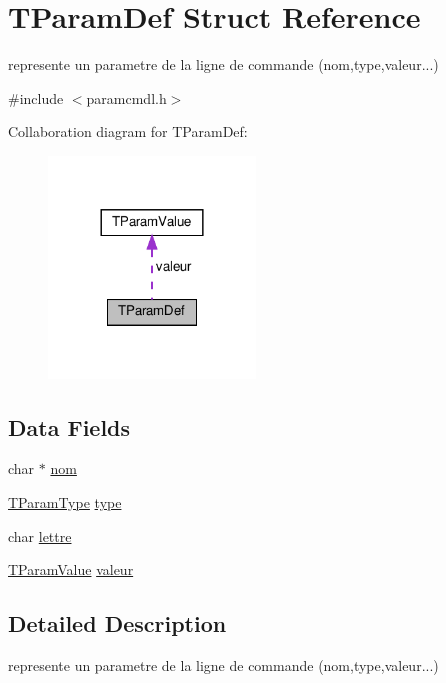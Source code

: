\hypertarget{structTParamDef}{}\section{T\+Param\+Def Struct Reference}
\label{structTParamDef}


represente un parametre de la ligne de commande (nom,type,valeur...)  




{\ttfamily \#include $<$paramcmdl.\+h$>$}



Collaboration diagram for T\+Param\+Def\+:
\nopagebreak
\begin{figure}[H]
\begin{center}
\leavevmode
\includegraphics[width=156pt]{structTParamDef__coll__graph}
\end{center}
\end{figure}
\subsection*{Data Fields}
\begin{DoxyCompactItemize}
\item 
char $\ast$ \hyperlink{structTParamDef_afa78db012abc7fecd18c60d6154e04f8}{nom}
\item 
\hyperlink{paramcmdl_8h_a07d4e5a29d675892ddc5f377533c06a5}{T\+Param\+Type} \hyperlink{structTParamDef_aaa8c69f39c6dd02a968dc15044810327}{type}
\item 
char \hyperlink{structTParamDef_a66254f6368c5542d3f14afdd1ea1e621}{lettre}
\item 
\hyperlink{unionTParamValue}{T\+Param\+Value} \hyperlink{structTParamDef_a3f5cbf75e393d35bb230dfe293f7c7ba}{valeur}
\end{DoxyCompactItemize}


\subsection{Detailed Description}
represente un parametre de la ligne de commande (nom,type,valeur...) 

